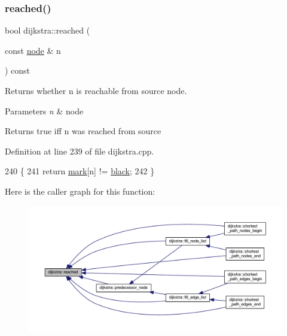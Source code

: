 \subsubsection{\texorpdfstring{reached()}{reached()}}
{\footnotesize\ttfamily bool dijkstra\+::reached (\begin{DoxyParamCaption}\item[{const \mbox{\hyperlink{classnode}{node}} \&}]{n }\end{DoxyParamCaption}) const}



Returns whether {\ttfamily n} is reachable from source node. 


\begin{DoxyParams}{Parameters}
{\em n} & node\\
\hline
\end{DoxyParams}
\begin{DoxyReturn}{Returns}
{\ttfamily true} iff {\ttfamily n} was reached from source 
\end{DoxyReturn}


Definition at line 239 of file dijkstra.\+cpp.


\begin{DoxyCode}
240 \{
241     \textcolor{keywordflow}{return} \mbox{\hyperlink{classdijkstra_a407f98e26ca2cfb8c9ddecf4f8babdcc}{mark}}[n] != \mbox{\hyperlink{classdijkstra_a2bdd8d3b57860b5715d01e65664e810fa958572ed471642bb14fce76ae9284bb5}{black}};
242 \}
\end{DoxyCode}
Here is the caller graph for this function\+:\nopagebreak
\begin{figure}[H]
\begin{center}
\leavevmode
\includegraphics[width=350pt]{classdijkstra_a405ff80abfc9ad98668534032eed6a5b_icgraph}
\end{center}
\end{figure}
\mbox{\label{classdijkstra_a444c288b3a49ec1c2973459dad55ffb3}} 
